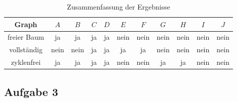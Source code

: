 \documentclass[11pt]{article}
\begin{document}
\begin{table}[h!]
  \centering
  \begin{tabular}{|c|c|c|c|c|c|c|c|c|c|c|}
    \hline
    Graph & $A$ & $B$ & $C$ & $D$ & $E$ & $F$ & $G$ & $H$ & $I$ & $J$ \\
    \hline
    freier Baum & ja & ja & ja & ja & nein & nein & nein & nein & nein & nein \\
    \hline
    vollständig & nein & nein & ja & ja & ja & ja & nein & nein & nein & nein \\
    \hline
    zyklenfrei & ja & ja & ja & ja & nein & nein & ja & ja & nein & nein \\
    \hline
  \end{tabular}
  \caption{Zusammenfassung der Ergebnisse}
  \label{tab:table_a2}
\end{table}
\newpage
\subsection*{Aufgabe 3}
\end{document}

